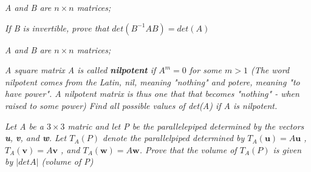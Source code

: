 \documentclass[12pt,letterpaper]{hmcpset}
\begin{document}
\begin{solution}
\end{solution}

\newpage



\begin{problem}[4.2.54]
\textit{A and B are $n\times n$ matrices;}
\begin{center}
\textit{If B is invertible, prove that $det (B^{-1}AB)= det(A)$}
\end{center}
\end{problem}

\begin{solution}
\end{solution}

\newpage


\begin{problem}[4.2.56]
\textit{A and B are $n\times n$ matrices;}
\begin{center}
\textit{ A square matrix A is called \textbf{nilpotent} if $A^m = 0$ for some $m > 1$ (The word nilpotent comes from the Latin, nil, meaning "nothing" and potere, meaning "to have power". A nilpotent matrix is thus one that that becomes "nothing" - when raised to some power) Find all possible values of det(A) if A is nilpotent.}
\end{center}
\end{problem}

\begin{solution}
\end{solution}

\newpage


\begin{problem}[Exploration 10]

\textit{Let A be a $3\times3$ matric and let P be the parallelepiped determined by the vectors \textbf{u}, \textbf{v}, and \textbf{w}. Let $T_A(P)$ denote the parallelpiped determined by $T_A(\textbf{u})= A\textbf{u}$ , $T_A(\textbf{v})= A\textbf{v}$ , and $T_A(\textbf{w})= A\textbf{w}$. Prove that the volume of $T_A(P)$ is given by $| det A|$ (volume of P)}
\end{problem}
\begin{solution}
\end{solution}

\newpage
\end{document}
